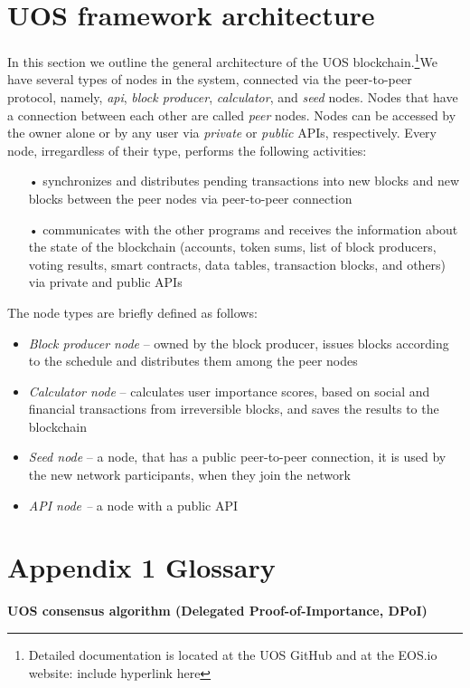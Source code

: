 \documentclass[a4paper,12pt]{article}
\begin{document}
\section{U{\degree}OS framework architecture}
In this section we outline the general architecture of the U{\degree}OS blockchain.\footnote{Detailed documentation is located at the U{\degree}OS GitHub and at the EOS.io website: include hyperlink here}We have several types of nodes in the system, connected via the peer-to-peer protocol, namely, \emph{api}, \emph{block producer}, \emph{calculator}, and \emph{seed} nodes. Nodes that have a connection between each other are called \emph{peer} nodes. Nodes can be accessed by the owner alone or by any user via \emph{private} or \emph{public} APIs, respectively. Every node, irregardless of their type, performs the following activities:
\begin{itemize}
\item[•] synchronizes and distributes pending transactions into new blocks and new blocks between the peer nodes via peer-to-peer connection
\item[•] communicates with the other programs and receives the information about the state of the blockchain (accounts, token sums, list of block producers, voting results, smart contracts, data tables, transaction blocks, and others) via private and public APIs
\end{itemize}

The node types are briefly defined as follows:
\begin{itemize}
\item \emph{Block producer node} -- owned by the block producer, issues blocks according to the schedule and distributes them among the peer nodes
\item \emph{Calculator node} -- calculates user importance scores, based on social and financial transactions from irreversible blocks, and saves the results to the blockchain
\item \emph{Seed node} -- a node, that has a public peer-to-peer connection, it is used by the new network participants, when they join the network
\item \emph{API node --} a node with a public API
\end{itemize}



\section*{Appendix 1 Glossary}
\textbf{U{\degree}OS consensus algorithm (Delegated Proof-of-Importance, DPoI)}
\end{document}
